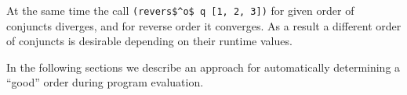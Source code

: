 
At the same time the call \lstinline{(revers$^o$ q [1, 2, 3])} for given order of conjuncts diverges, and for reverse order it converges. As a result a
different order of conjuncts is desirable depending on their runtime values.

In the following sections we describe an approach for automatically determining a ``good'' order during program evaluation.

